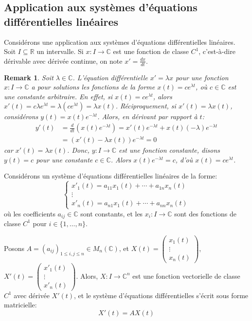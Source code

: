 \documentclass{article}
\newtheorem{remark}{Remark}
\begin{document}
\subsection{Application aux systèmes d'équations différentielles linéaires}

Considérons une application aux systèmes d'équations différentielles linéaires.
Soit $I \subseteq \mathbb{R}$ un intervalle. Si $x: I \to \mathbb{C}$ est une fonction de classe $C^1$, c'est-à-dire dérivable avec dérivée continue, on note $x' = \frac{dx}{dt}$.

\begin{remark}
Soit $\lambda \in \mathbb{C}$. L'équation différentielle $x' = \lambda x$ pour une fonction $x: I \to \mathbb{C}$ a pour solutions les fonctions de la forme $x(t) = c e^{\lambda t}$, où $c \in \mathbb{C}$ est une constante arbitraire. En effet, si $x(t) = c e^{\lambda t}$, alors $x'(t) = c \lambda e^{\lambda t} = \lambda (c e^{\lambda t}) = \lambda x(t)$. Réciproquement, si $x'(t) = \lambda x(t)$, considérons $y(t) = x(t) e^{-\lambda t}$. Alors, en dérivant par rapport à $t$:
\begin{align*}
y'(t) &= \frac{d}{dt} (x(t) e^{-\lambda t}) = x'(t) e^{-\lambda t} + x(t) (-\lambda) e^{-\lambda t} \\
&= (x'(t) - \lambda x(t)) e^{-\lambda t} = 0
\end{align*}
car $x'(t) = \lambda x(t)$. Donc, $y: I \to \mathbb{C}$ est une fonction constante, disons $y(t) = c$ pour une constante $c \in \mathbb{C}$. Alors $x(t) e^{-\lambda t} = c$, d'où $x(t) = c e^{\lambda t}$.
\end{remark}

Considérons un système d'équations différentielles linéaires de la forme:
\begin{equation*}
\begin{cases}
x'_1(t) = a_{11}x_1(t) + \cdots + a_{1n}x_n(t) \\
\vdots \\
x'_n(t) = a_{n1}x_1(t) + \cdots + a_{nn}x_n(t)
\end{cases}
\end{equation*}
où les coefficients $a_{ij} \in \mathbb{C}$ sont constants, et les $x_i: I \to \mathbb{C}$ sont des fonctions de classe $C^1$ pour $i \in \{1, \ldots, n\}$.

Posons $A = (a_{ij})_{1 \le i, j \le n} \in M_n(\mathbb{C})$, et $X(t) = \begin{pmatrix} x_1(t) \\ \vdots \\ x_n(t) \end{pmatrix}$, $X'(t) = \begin{pmatrix} x'_1(t) \\ \vdots \\ x'_n(t) \end{pmatrix}$. Alors, $X: I \to \mathbb{C}^n$ est une fonction vectorielle de classe $C^1$ avec dérivée $X'(t)$, et le système d'équations différentielles s'écrit sous forme matricielle:
\[ X'(t) = A X(t) \]
\end{document}
